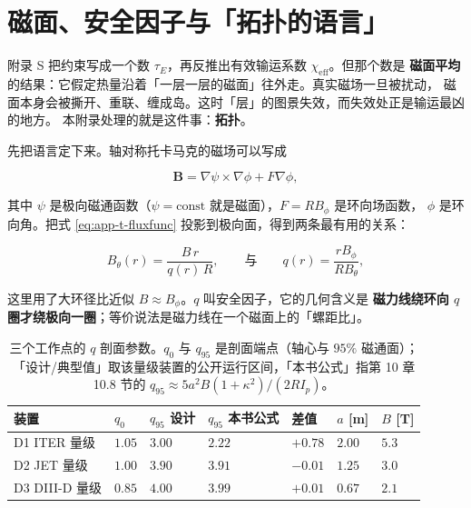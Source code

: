 
\section{磁面、安全因子与「拓扑的语言」}
\label{sec:app-t-topology}

附录 S 把约束写成一个数 $\tau_E$，再反推出有效输运系数 $\chi_{\mathrm{eff}}$。但那个数是
\textbf{磁面平均}的结果：它假定热量沿着「一层一层的磁面」往外走。真实磁场一旦被扰动，
磁面本身会被撕开、重联、缠成岛。这时「层」的图景失效，而失效处正是输运最凶的地方。
本附录处理的就是这件事：\textbf{拓扑}。

先把语言定下来。轴对称托卡马克的磁场可以写成

\begin{equation}
\mathbf{B}=\nabla\psi\times\nabla\phi+F\nabla\phi ,
\label{eq:app-t-fluxfunc}
\end{equation}

其中 $\psi$ 是极向磁通函数（$\psi=\text{const}$ 就是磁面），$F=RB_\phi$ 是环向场函数，
$\phi$ 是环向角。把式 \eqref{eq:app-t-fluxfunc} 投影到极向面，得到两条最有用的关系：

\begin{equation}
B_\theta(r)=\frac{B\,r}{q(r)\,R},
\qquad\text{与}\qquad
q(r)=\frac{rB_\phi}{RB_\theta},
\label{eq:app-t-bo}
\end{equation}

这里用了大环径比近似 $B\approx B_\phi$。$q$ 叫安全因子，它的几何含义是
\textbf{磁力线绕环向 $q$ 圈才绕极向一圈}；等价说法是磁力线在一个磁面上的「螺距比」。

\begin{table}[htbp]
  \centering
  \caption{三个工作点的 $q$ 剖面参数。$q_0$ 与 $q_{95}$ 是剖面端点（轴心与 $95\%$ 磁通面）；
    「设计/典型值」取该量级装置的公开运行区间，「本书公式」指第 10 章 10.8 节的
    $q_{95}\approx 5a^2B(1+\kappa^2)/(2RI_p)$。}
  \label{tab:app-t-q95}
  \begin{tabular}{@{}p{3.0cm}p{1.4cm}p{1.9cm}p{1.9cm}p{1.6cm}p{1.5cm}p{1.5cm}@{}}
    \toprule
    装置 & $q_0$ & $q_{95}$ 设计 & $q_{95}$ 本书公式 & 差值 & $a$ [m] & $B$ [T] \\
    \midrule
    D1 ITER 量级 & $1.05$ & $3.00$ & $2.22$ & $+0.78$ & $2.00$ & $5.3$ \\
    D2 JET 量级 & $1.00$ & $3.90$ & $3.91$ & $-0.01$ & $1.25$ & $3.0$ \\
    D3 DIII-D 量级 & $0.85$ & $4.00$ & $3.99$ & $+0.01$ & $0.67$ & $2.1$ \\
    \bottomrule
  \end{tabular}
\end{table}

